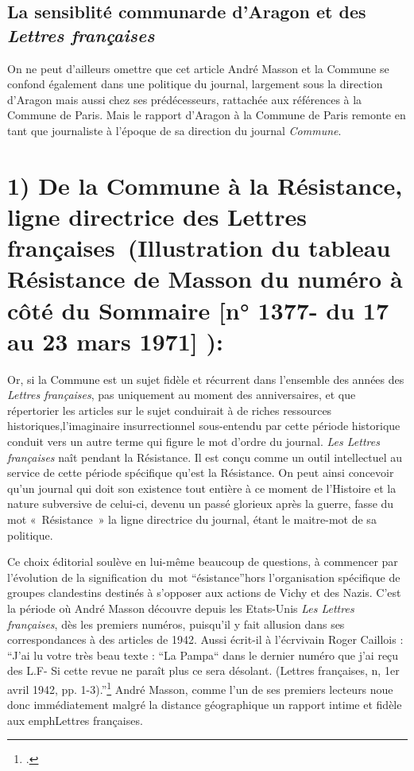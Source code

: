 \subsection{La sensiblité communarde d'Aragon et des \emph{Lettres françaises}}
 On ne peut d’ailleurs omettre que cet article André Masson et la Commune se confond également dans une politique du journal, largement sous la direction d’Aragon mais aussi chez ses prédécesseurs, rattachée aux références à la Commune de Paris. Mais le rapport d’Aragon à la Commune de Paris remonte en tant que journaliste à l’époque de sa direction du journal \emph{Commune}. 


\section{1)	De la Commune à la Résistance, ligne directrice des Lettres françaises (Illustration du tableau Résistance de Masson du numéro à côté du Sommaire [n° 1377- du 17 au 23 mars 1971] ):}

Or, si la Commune est un sujet fidèle et récurrent dans l’ensemble des années des \emph{Lettres françaises}, pas uniquement au moment des anniversaires, et que répertorier les articles sur le sujet conduirait à de riches ressources historiques,l’imaginaire insurrectionnel sous-entendu par cette période historique conduit vers un autre terme qui figure le mot d’ordre du journal. \emph{Les Lettres françaises} naît pendant la Résistance. Il est conçu comme un outil intellectuel au service de cette période spécifique qu’est la Résistance. On peut ainsi concevoir qu’un journal qui doit son existence tout entière à ce moment de l’Histoire et la nature subversive de celui-ci, devenu un passé glorieux après la guerre, fasse du mot « Résistance » la ligne directrice du journal, étant le maitre-mot de sa politique. 


	Ce choix éditorial soulève en lui-même beaucoup de questions, à commencer par l’évolution de la signification du mot \enquote{ésistance}hors l’organisation spécifique de groupes clandestins destinés à s’opposer aux actions de Vichy et des Nazis. C’est la période où André Masson découvre depuis les Etats-Unis \emph{Les Lettres françaises}, dès les premiers numéros, puisqu’il y  fait allusion dans ses correspondances à des articles de 1942. Aussi écrit-il à l’écrvivain Roger Caillois : \enquote{J’ai lu votre très beau texte : “La Pampa“ dans le dernier numéro que j’ai reçu des L.F- Si cette revue ne paraît plus ce sera désolant. (Lettres françaises, n, 1er avril 1942, pp. 1-3).}\footcite[p482]{anneessurrealistes} André Masson, comme l’un de ses premiers lecteurs noue donc immédiatement malgré la distance géographique un rapport intime et fidèle aux emph{Lettres françaises}. 


